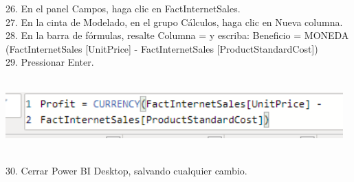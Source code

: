 \begin{flushleft}
\begin{itemize}
26. En el panel Campos, haga clic en FactInternetSales.\\
27. En la cinta de Modelado, en el grupo Cálculos, haga clic en Nueva columna.\\
28. En la barra de fórmulas, resalte Columna = y escriba:
Beneficio = MONEDA (FactInternetSales [UnitPrice] -
FactInternetSales [ProductStandardCost])\\
29. Pressionar Enter.\\
\textbf{ }\\
\begin{center}
	\includegraphics[width=13cm]{./Imagenes/img41} 
	\end{center}
\textbf{ }\\
30. Cerrar Power BI Desktop, salvando cualquier cambio.
\end{itemize} 


\end{flushleft}